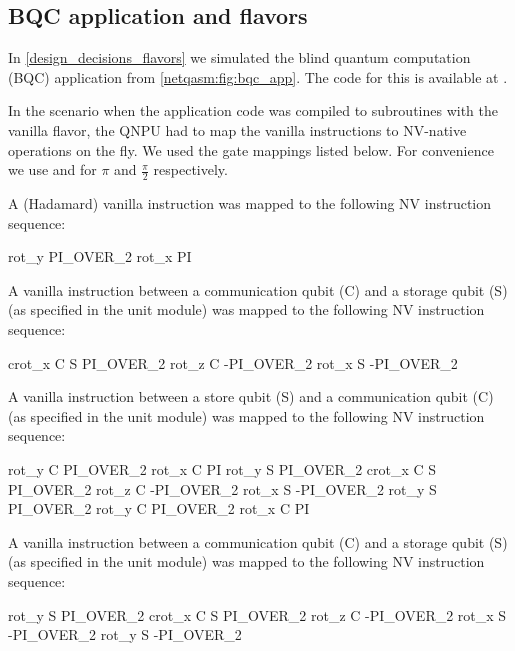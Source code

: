 \subsection{BQC application and flavors}
In \cref{design_decisions_flavors} we simulated the blind quantum computation
(BQC) application from \cref{netqasm:fig:bqc_app}. The code for this is available at
\cite{git_squidasm}.

In the scenario when the application code was compiled to subroutines with the
vanilla flavor, the \ac{QNPU} had to map the vanilla instructions to NV-native
operations on the fly. We used the gate mappings listed below. For
convenience we use  and  for $\pi$ and $\frac{\pi}{2}$
respectively.

A  (Hadamard) vanilla instruction was mapped to the following NV instruction sequence:
\begin{nqcode}
  rot_y PI_OVER_2
  rot_x PI\end{nqcode}

A  vanilla instruction between a communication qubit (C) and a storage
qubit (S) (as specified in the unit module) was mapped to the following NV
instruction sequence:
\begin{nqcode}
  crot_x C S PI_OVER_2
  rot_z C -PI_OVER_2
  rot_x S -PI_OVER_2\end{nqcode}

A  vanilla instruction between a store qubit (S) and a communication
qubit (C) (as specified in the unit module) was mapped to the following NV
instruction sequence:
\begin{nqcode}
  rot_y C PI_OVER_2
  rot_x C PI
  rot_y S PI_OVER_2
  crot_x C S PI_OVER_2
  rot_z C -PI_OVER_2
  rot_x S -PI_OVER_2
  rot_y S PI_OVER_2
  rot_y C PI_OVER_2
  rot_x C PI\end{nqcode}

A  vanilla instruction between a communication qubit (C) and a storage
qubit (S) (as specified in the unit module) was mapped to the following NV
instruction sequence:
\begin{nqcode}
  rot_y S PI_OVER_2
  crot_x C S PI_OVER_2
  rot_z C -PI_OVER_2
  rot_x S -PI_OVER_2
  rot_y S -PI_OVER_2\end{nqcode}